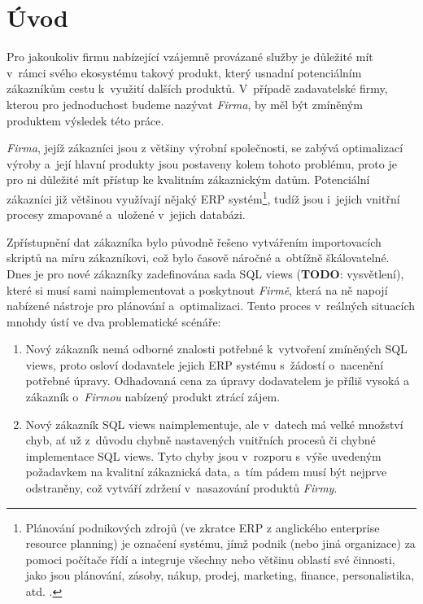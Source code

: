 \chapter{Úvod}\label{chap:intro}


Pro jakoukoliv firmu nabízející vzájemně provázané služby je důležité mít v~rámci svého ekosystému takový produkt, který usnadní potenciálním zákazníkům cestu k~využití dalších produktů.
V~případě zadavatelské firmy, kterou pro jednoduchost budeme nazývat \textit{Firma}, by měl být zmíněným produktem výsledek této práce.

\textit{Firma}, jejíž zákazníci jsou z většiny výrobní společnosti, se zabývá optimalizací výroby a~její hlavní produkty jsou postaveny kolem tohoto problému, proto je pro ni důležité mít přístup ke kvalitním zákaznickým datům.
Potenciální zákazníci již většinou využívají nějaký ERP systém\footnote{Plánování podnikových zdrojů (ve zkratce ERP z anglického enterprise resource planning) je označení systému, jímž podnik (nebo jiná organizace) za pomoci počítače řídí a integruje všechny nebo většinu oblastí své činnosti, jako jsou plánování, zásoby, nákup, prodej, marketing, finance, personalistika, atd. \cite{ERP}.},
tudíž jsou i~jejich vnitřní procesy zmapované a~uložené v~jejich databázi.

Zpřístupnění dat zákazníka bylo původně řešeno vytvářením importovacích skriptů na míru zákazníkovi, což bylo časově náročné a~obtížně škálovatelné.
Dnes je pro nové zákazníky zadefinována sada SQL views (\textbf{TODO}: vysvětlení), které si musí sami naimplementovat a poskytnout \textit{Firmě}, která na ně napojí nabízené nástroje pro plánování a~optimalizaci.
Tento proces v~reálných situacích mnohdy ústí ve dva problematické scénáře:

\begin{enumerate}
    \item {
        Nový zákazník nemá odborné znalosti potřebné k~vytvoření zmíněných SQL views, proto osloví dodavatele jejich ERP systému s~žádostí o~nacenění potřebné úpravy.
        Odhadovaná cena za úpravy dodavatelem je příliš vysoká a zákazník o~\textit{Firmou} nabízený produkt ztrácí zájem.
    }
    \item {
        Nový zákazník SQL views naimplementuje, ale v~datech má velké množství chyb, ať už z~důvodu chybně nastavených vnitřních procesů či chybné implementace SQL views.
        Tyto chyby jsou v~rozporu s~výše uvedeným požadavkem na kvalitní zákaznická data, a~tím pádem musí být nejprve odstraněny, což vytváří zdržení v~nasazování produktů \textit{Firmy}.
    }
\end{enumerate}

